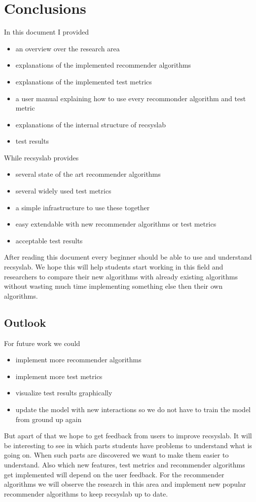 
\chapter{Conclusions}
In this document I provided
\begin{itemize}
\item an overview over the research area
\item explanations of the implemented recommender algorithms
\item explanations of the implemented test metrics
\item a user manual explaining how to use every recommonder algorithm and test metric
\item explanations of the internal structure of recsyslab
\item test results
\end{itemize}

While recsyslab provides
\begin{itemize}
\item several state of the art recommender algorithms
\item several widely used test metrics
\item a simple infrastructure to use these together
\item easy extendable with new recommender algorithms or test metrics
\item acceptable test results
\end{itemize}
After reading this document every beginner should be able to use and understand recsyslab.
We hope this will help students start working in this field and researchers to compare their new algorithms
with already existing algorithms without wasting much time implementing something else
then their own algorithms.


\section{Outlook}
For future work we could
\begin{itemize}
\item implement more recommender algorithms
\item implement more test metrics
\item visualize test results graphically
\item update the model with new interactions so we do not have to train the model from ground up again
\end{itemize}

But apart of that we hope to get feedback from users to improve recsyslab.
It will be interesting to see in which parts students have problems to 
understand what is going on. When such parts are discovered we want to make
them easier to understand. Also which new features, test metrics and recommender algorithms
get implemented will depend on the user feedback. For the recommender algorithms
we will observe the research in this area and implement new popular recommender algorithms
to keep recsyslab up to date.
